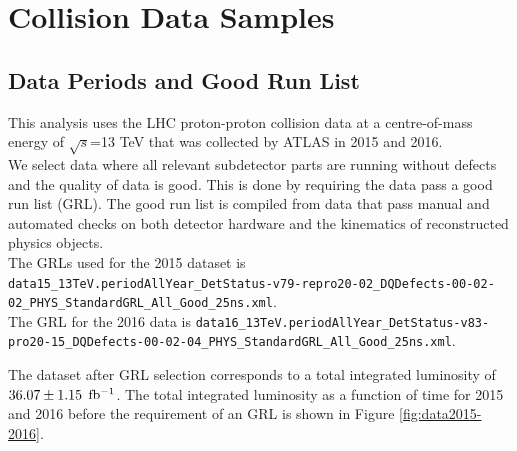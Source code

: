 \chapter{Collision Data Samples}
\label{chap:data}
\section{Data Periods and Good Run List}
\label{EventSel:GRL}

\indent This analysis uses the LHC proton-proton collision data at a centre-of-mass energy of $\sqrt{s}$=13 TeV that was collected by ATLAS in 2015 and 2016. \\

\indent We select data where all relevant subdetector parts are running without defects and the quality of data is good.  This is done by requiring the data pass a good run list (GRL).  The good run list is compiled from data that pass manual and automated checks on both detector hardware and the kinematics of reconstructed physics objects.  \\

\indent The GRLs used for the 2015 dataset is {\tt data15\_13TeV.periodAllYear\_DetStatus-v79-repro20-02\_DQDefects-00-02-02\_PHYS\_StandardGRL\_All\_Good\_25ns.xml}.  \\
\indent The GRL for the 2016 data is {\tt data16\_13TeV.periodAllYear\_DetStatus-v83-pro20-15\_DQDefects-00-02-04\_PHYS\_StandardGRL\_All\_Good\_25ns.xml}.

\indent The dataset after GRL selection corresponds to a total integrated luminosity of $36.07 \pm 1.15$ $\mbox{fb$^{-1}$}$.  The total integrated luminosity as a function of time for 2015 and 2016 before the requirement of an GRL is shown in Figure \ref{fig:data2015-2016}.\\

